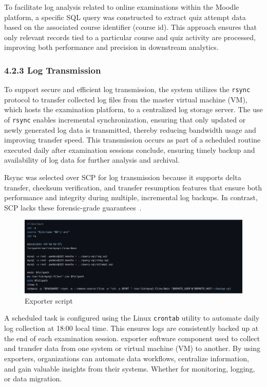 To facilitate log analysis related to online examinations within the Moodle platform, a specific SQL query was constructed to extract quiz attempt data based on the associated course identifier (course id). This approach ensures that only relevant records tied to a particular course and quiz activity are processed, improving both performance and precision in downstream analytics.
\subsubsection{4.2.3 Log Transmission}
To support secure and efficient log transmission, the system utilizes the \texttt{rsync} protocol to transfer collected log files from the master virtual machine (VM), which hosts the examination platform, to a centralized log storage server. The use of \texttt{rsync} enables incremental synchronization, ensuring that only updated or newly generated log data is transmitted, thereby reducing bandwidth usage and improving transfer speed. This transmission occurs as part of a scheduled routine executed daily after examination sessions conclude, ensuring timely backup and availability of log data for further analysis and archival.

Rsync was selected over SCP for log transmission because it supports delta transfer, checksum verification, and transfer resumption features that ensure both performance and integrity during multiple, incremental log backups. In contrast, SCP lacks these forensic-grade guarantees~\cite{nussbaum2012performance,superuser_rsync_vs_scp,stackexchange_rsync_scp_checksum}.


\begin{figure}[H] 
	\centering
	\includegraphics[width=14cm]{figure/export-sql.png}
	\caption{Exporter script}
	\label{fig:exporter}
\end{figure}

A scheduled task is configured using the Linux \texttt{crontab} utility to automate daily log collection at 18:00 local time. This ensures logs are consistently backed up at the end of each examination session. exporter software component used to collect and transfer data from one system or virtual machine (VM) to another. By using exporters, organizations can automate data workflows, centralize information, and gain valuable insights from their systems. Whether for monitoring, logging, or data migration.


